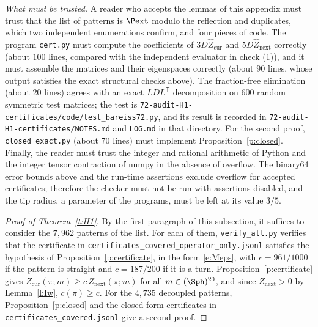 \emph{What must be trusted.} A reader who accepts the lemmas of this appendix must trust that the list of patterns is $\Pext$ modulo the reflection and duplicates, which two independent enumerations confirm, and four pieces of code. The program \texttt{cert.py} must compute the coefficients of $3 D \hat Z_{\mathrm{cur}}$ and $5 D \hat Z_{\mathrm{next}}$ correctly (about $100$ lines, compared with the independent evaluator in check (1)), and it must assemble the matrices and their eigenspaces correctly (about $90$ lines, whose output satisfies the exact structural checks above). The fraction-free elimination (about $20$ lines) agrees with an exact $LDL^{\mathsf T}$ decomposition on $600$ random symmetric test matrices; the test is \texttt{72-\allowbreak audit-\allowbreak H1-\allowbreak certificates/\allowbreak code/\allowbreak test\_\allowbreak bareiss72.py}, and its result is recorded in \texttt{72-\allowbreak audit-\allowbreak H1-\allowbreak certificates/\allowbreak NOTES.md} and \texttt{LOG.md} in that directory. For the second proof, \texttt{closed\_exact.py} (about $70$ lines) must implement Proposition~\ref{p:closed}. Finally, the reader must trust the integer and rational arithmetic of Python and the integer tensor contraction of numpy in the absence of overflow. The binary64 error bounds above and the run-time assertions exclude overflow for accepted certificates; therefore the checker must not be run with assertions disabled, and the tip radius, a parameter of the programs, must be left at its value $3/5$.

\begin{proof}[Proof of Theorem~\ref{t:H1}]
By the first paragraph of this subsection, it suffices to consider the $7{,}962$ patterns of the list. For each of them, \texttt{verify\_all.py} verifies that the certificate in \texttt{certificates\_\allowbreak covered\_\allowbreak operator\_\allowbreak only.jsonl} satisfies the hypothesis of Proposition~\ref{p:certificate}, in the form \eqref{e:Meps}, with $c = 961/1000$ if the pattern is straight and $c = 187/200$ if it is a turn. Proposition~\ref{p:certificate} gives $Z_{\mathrm{cur}}(\pi; m) \ge c \, Z_{\mathrm{next}}(\pi; m)$ for all $m \in (\Sph)^{20}$, and since $Z_{\mathrm{next}} > 0$ by Lemma~\ref{l:Iw}, $c(\pi) \ge c$. For the $4{,}735$ decoupled patterns, Proposition~\ref{p:closed} and the closed-form certificates in \texttt{certificates\_\allowbreak covered.jsonl} give a second proof.
\end{proof}
